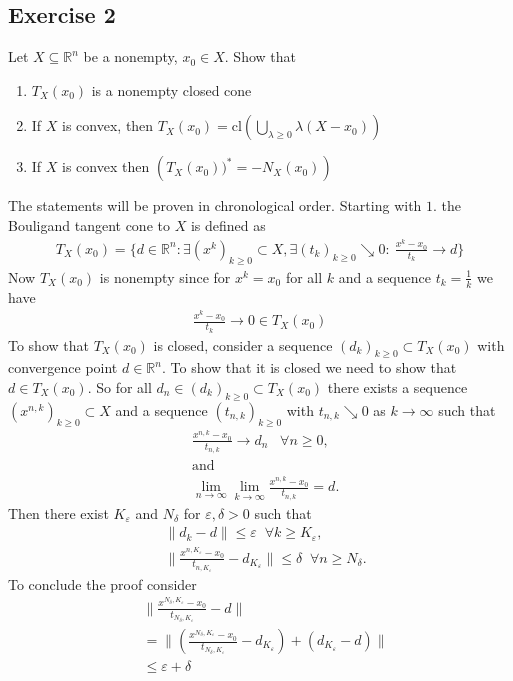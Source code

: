 \subsection{Exercise 2}
Let $X \subseteq \mathbb{R}^{n}$ be a nonempty, $x_0 \in X$. Show that
\begin{enumerate}
    \item $T_X(x_0)$ is a nonempty closed cone
    \item If $X$ is convex, then $T_X(x_0) = \text{cl}\left( \bigcup_{\lambda
        \ge 0 } \lambda \left( X - x_0 \right)  \right)$
    \item If $X$ is convex then $\left( T_X(x_0))^{*} = - N_X(x_0) \right) $
\end{enumerate}
The statements will be proven in chronological order. Starting with $1.$ the
Bouligand tangent cone to $X$ is defined as
\begin{align}
    T_X(x_0) = \{d \in \mathbb{R}^{n}: \exists (x^{k})_{k\ge 0}\subset X, \exists
    (t_k)_{k\ge 0}\searrow 0 :\ \frac{x^{k} -x_0}{t_k}\to d\}
\end{align}
Now $T_X(x_0)$ is nonempty since for $x^{k} = x_0$ for all $k$ and a sequence $t_k =
\frac{1}{k}$ we have
\begin{align}
    \frac{x^{k}-x_0}{t_k} \to 0 \in T_X(x_0)
\end{align}
To show that $T_X(x_0)$ is closed, consider a sequence $(d_k)_{k\ge 0}\subset
T_X(x_0)$ with convergence point $d \in \mathbb{R}^{n}$. To show that it is closed we
need to show that $d \in T_X(x_0)$. So for all $d_n \in (d_k)_{k\ge 0}
\subset T_X(x_0)$ there exists a sequence $(x^{n,k})_{k\ge 0} \subset X$ and
a sequence $(t_{n, k})_{k\ge 0}$ with $t_{n, k} \searrow 0$ as $k \to
\infty$ such that
\begin{align}
    &\frac{x^{n,k}-x_0}{t_{n,k}} \to d_n \;\;\; \forall n\ge 0,\\
    &\text{and}\nonumber\\
    &\lim_{n\to \infty}\lim_{k \to \infty}\frac{x^{n,k}-x_0}{t_{n,k}} = d.
\end{align}
Then there exist $K_\varepsilon$ and $N_\delta$ for $\varepsilon,\delta >0$
such that
\begin{align}
    &\|d_k - d\|\le \varepsilon \;\; \forall k\ge K_\varepsilon,\\
    &\|\frac{x^{n,K_\varepsilon}-x_0}{t_{n,K_\varepsilon}} -
    d_{K_\varepsilon}\| \le \delta \;\; \forall n \ge N_\delta.
\end{align}
To conclude the proof consider
\begin{align}
    &\|\frac{x^{N_\delta,K_\varepsilon}-x_0}{t_{N_\delta,K_\varepsilon}} -
    d\|\\
    &= \|\left(\frac{x^{N_\delta,K_\varepsilon}-x_0}{t_{N_\delta,K_\varepsilon}} -
    d_{K_\varepsilon}\right) + \left( d_{K_\varepsilon} - d\right) \|\\
    &\le \varepsilon + \delta
\end{align}
